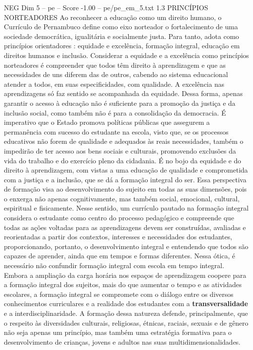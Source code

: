 \begin{textsample}{NEG Dim 5 – pe – Score -1.00 – pe/pe\_em\_5.txt}  \label{ex:f5_neg_085}
1.3 PRINCÍPIOS NORTEADORES Ao reconhecer a educação como um direito humano, o Currículo de Pernambuco define como eixo norteador o fortalecimento de uma sociedade democrática, igualitária e socialmente justa.
Para tanto, adota como princípios orientadores : equidade e excelência, formação integral, educação em direitos humanos e inclusão.
Considerar a equidade e a excelência como princípios norteadores é compreender que todos têm direito à aprendizagem e que as necessidades de uns diferem das de outros, cabendo ao sistema educacional atender a todos, em suas especificidades, com qualidade.
A excelência nas aprendizagens só faz sentido se acompanhada da equidade.
Dessa forma, apenas garantir o acesso à educação não é suficiente para a promoção da justiça e da inclusão social, como também não é para a consolidação da democracia.
É imperativo que o Estado promova políticas públicas que assegurem a permanência com sucesso do estudante na escola, visto que, se os processos educativos não forem de qualidade e adequados às reais necessidades, também o impedirão de ter acesso aos bens sociais e culturais, promovendo exclusões da vida do trabalho e do exercício pleno da cidadania.
É no bojo da equidade e do direito à aprendizagem, com vistas a uma educação de qualidade e comprometida com a justiça e a inclusão, que se dá a formação integral do ser.
Essa perspectiva de formação visa ao desenvolvimento do sujeito em todas as suas dimensões, pois o enxerga não apenas cognitivamente, mas também social, emocional, cultural, espiritual e fisicamente.
Nesse sentido, um currículo pautado na formação integral considera o estudante como centro do processo pedagógico e compreende que todas as ações voltadas para as aprendizagens devem ser construídas, avaliadas e reorientadas a partir dos contextos, interesses e necessidades dos estudantes, proporcionando, portanto, o desenvolvimento integral e entendendo que todos são capazes de aprender, ainda que em tempos e formas diferentes.
Nessa ótica, é necessário não confundir formação integral com escola em tempo integral.
Embora a ampliação da carga horária nos espaços de aprendizagem coopere para a formação integral dos sujeitos, mais do que aumentar o tempo e as atividades escolares, a formação integral se compromete com o diálogo entre os diversos conhecimentos curriculares e a realidade dos estudantes com a \textbf{transversalidade} e a interdisciplinaridade.
A formação dessa natureza defende, principalmente, que o respeito às diversidades culturais, religiosas, étnicas, raciais, sexuais e de gênero não seja apenas um princípio, mas também uma estratégia formativa para o desenvolvimento de crianças, jovens e adultos nas suas multidimensionalidades.

\end{textsample}
